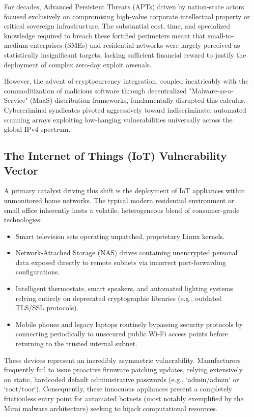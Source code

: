 For decades, Advanced Persistent Threats (APTs) driven by nation-state actors focused exclusively on compromising high-value corporate intellectual property or critical sovereign infrastructure. The substantial cost, time, and specialized knowledge required to breach these fortified perimeters meant that small-to-medium enterprises (SMEs) and residential networks were largely perceived as statistically insignificant targets, lacking sufficient financial reward to justify the deployment of complex zero-day exploit arsenals.

However, the advent of cryptocurrency integration, coupled inextricably with the commoditization of malicious software through decentralized "Malware-as-a-Service" (MaaS) distribution frameworks, fundamentally disrupted this calculus. Cybercriminal syndicates pivoted aggressively toward indiscriminate, automated scanning arrays exploiting low-hanging vulnerabilities universally across the global IPv4 spectrum. 

\subsection{The Internet of Things (IoT) Vulnerability Vector}
A primary catalyst driving this shift is the deployment of IoT appliances within unmonitored home networks. The typical modern residential environment or small office inherently hosts a volatile, heterogeneous blend of consumer-grade technologies:
\begin{itemize}
    \item Smart television sets operating unpatched, proprietary Linux kernels.
    \item Network-Attached Storage (NAS) drives containing unencrypted personal data exposed directly to remote subnets via incorrect port-forwarding configurations.
    \item Intelligent thermostats, smart speakers, and automated lighting systems relying entirely on deprecated cryptographic libraries (e.g., outdated TLS/SSL protocols).
    \item Mobile phones and legacy laptops routinely bypassing security protocols by connecting periodically to unsecured public Wi-Fi access points before returning to the trusted internal subnet.
\end{itemize}

These devices represent an incredibly asymmetric vulnerability. Manufacturers frequently fail to issue proactive firmware patching updates, relying extensively on static, hardcoded default administrative passwords (e.g., `admin/admin` or `root/toor`). Consequently, these innocuous appliances present a completely frictionless entry point for automated botnets (most notably exemplified by the Mirai malware architecture) seeking to hijack computational resources.


